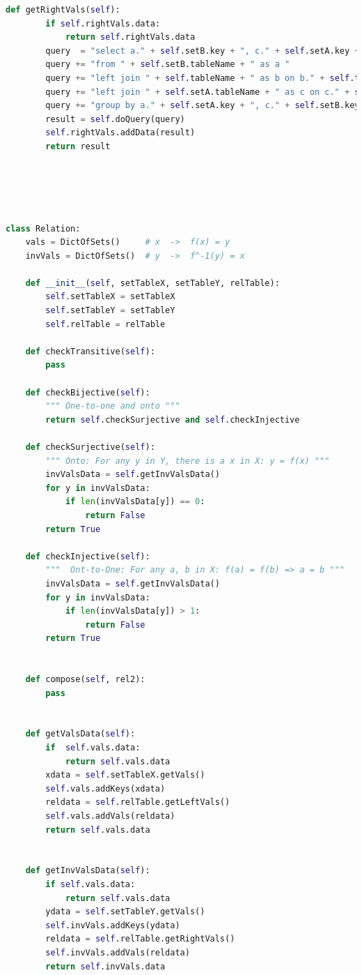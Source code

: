 \begin{lstlisting}[language=python]
    def getRightVals(self):
        if self.rightVals.data:
            return self.rightVals.data
        query  = "select a." + self.setB.key + ", c." + self.setA.key + " "
        query += "from " + self.setB.tableName + " as a "
        query += "left join " + self.tableName + " as b on b." + self.translKeyB + " = a." + self.setB.key + " "
        query += "left join " + self.setA.tableName + " as c on c." + self.setA.key + " = b." + self.translKeyA + " "
        query += "group by a." + self.setA.key + ", c." + self.setB.key
        result = self.doQuery(query)
        self.rightVals.addData(result)
        return result





class Relation:
    vals = DictOfSets()     # x  ->  f(x) = y
    invVals = DictOfSets()  # y  ->  f^-1(y) = x

    def __init__(self, setTableX, setTableY, relTable):
        self.setTableX = setTableX
        self.setTableY = setTableY
        self.relTable = relTable

    def checkTransitive(self):
        pass

    def checkBijective(self):
        """ One-to-one and onto """
        return self.checkSurjective and self.checkInjective

    def checkSurjective(self):
        """ Onto: For any y in Y, there is a x in X: y = f(x) """
        invValsData = self.getInvValsData()
        for y in invValsData:
            if len(invValsData[y]) == 0:
                return False
        return True

    def checkInjective(self):
        """  Ont-to-One: For any a, b in X: f(a) = f(b) => a = b """
        invValsData = self.getInvValsData()
        for y in invValsData:
            if len(invValsData[y]) > 1:
                return False
        return True
            

    def compose(self, rel2):
        pass


    def getValsData(self):
        if  self.vals.data:
            return self.vals.data
        xdata = self.setTableX.getVals()
        self.vals.addKeys(xdata)
        reldata = self.relTable.getLeftVals()
        self.vals.addVals(reldata)
        return self.vals.data


    def getInvValsData(self):
        if self.vals.data:
            return self.vals.data
        ydata = self.setTableY.getVals()
        self.invVals.addKeys(ydata)
        reldata = self.relTable.getRightVals()
        self.invVals.addVals(reldata)
        return self.invVals.data





\end{lstlisting}
